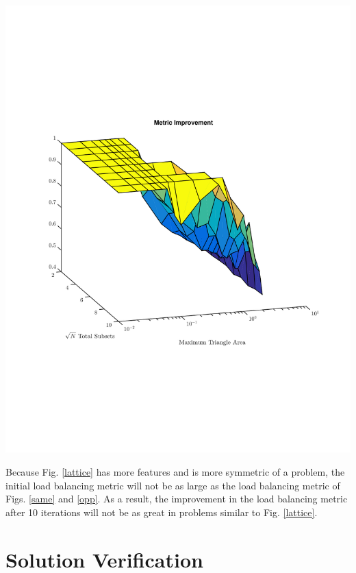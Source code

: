 \noindent\begin{minipage}{\textwidth}
\centering
\includegraphics[scale=0.80, trim = 2cm 6cm 2cm 7cm,clip]{figures/lattice_diff.pdf}
\label{latticediff}
\end{minipage}
\smallskip

Because Fig. \ref{lattice} has more features and is more symmetric of a problem, the initial load balancing metric will not be as large as the load balancing metric of Figs. \ref{same} and \ref{opp}. As a result, the improvement in the load balancing metric after 10 iterations will not be as great in problems similar to Fig. \ref{lattice}. 



\section{Solution Verification}

